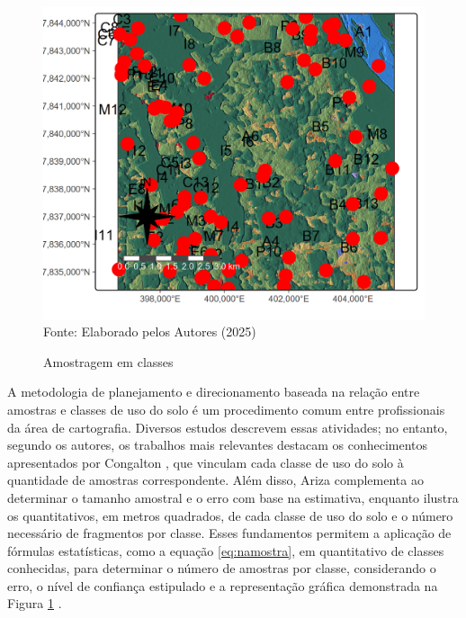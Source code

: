 	\begin{figure}
		\begin{center}
			\centering  \small \caption{Amostragem em classes}
			\includegraphics[width=0.97\linewidth]{FIGURAS/usoSOLOamostras}
			\label{fig:usoSOLOamostras}\\{ Fonte:   Elaborado pelos Autores (2025)}
		\end{center}
	\end{figure} 
	\hspace*{1.25 cm} A metodologia de planejamento e direcionamento baseada na relação entre amostras e classes de uso do solo é um procedimento comum entre profissionais da área de cartografia. Diversos estudos descrevem essas atividades; no entanto, segundo os autores, os trabalhos mais relevantes destacam os conhecimentos apresentados por Congalton \cite[p.79]{Congalton}, que vinculam cada classe de uso do solo à quantidade de amostras correspondente. Além disso, Ariza \cite[p.135]{Ariza} complementa ao determinar o tamanho amostral e o erro com base na estimativa, enquanto \cite[p.192-196]{Ariza} ilustra os quantitativos, em metros quadrados, de cada classe de uso do solo e o número necessário de fragmentos por classe. Esses fundamentos permitem a aplicação de fórmulas estatísticas, como a equação \eqref{eq:namostra}, em quantitativo de classes conhecidas,  para determinar o número de amostras por classe, considerando o erro, o nível de confiança estipulado e a representação gráfica demonstrada na Figura \ref{fig:usoSOLOamostras}  .\\
		
